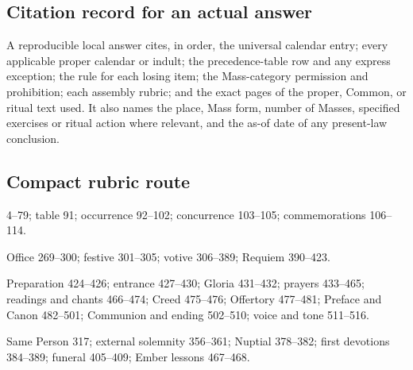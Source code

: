 \subsection{Citation record for an actual answer}

A reproducible local answer cites, in order, the universal calendar entry; every applicable proper calendar or indult; the precedence-table row and any express exception; the rule for each losing item; the Mass-category permission and prohibition; each assembly rubric; and the exact pages of the proper, Common, or ritual text used. It also names the place, Mass form, number of Masses, specified exercises or ritual action where relevant, and the as-of date of any present-law conclusion.

\subsection{Compact rubric route}

\begin{description}[style=multiline,leftmargin=0.22\linewidth,labelwidth=0.19\linewidth,itemsep=0.25em]
\item[Calendar] 4--79; table 91; occurrence 92--102; concurrence 103--105; commemorations 106--114.
\item[Mass choice] Office 269--300; festive 301--305; votive 306--389; Requiem 390--423.
\item[Assembly] Preparation 424--426; entrance 427--430; Gloria 431--432; prayers 433--465; readings and chants 466--474; Creed 475--476; Offertory 477--481; Preface and Canon 482--501; Communion and ending 502--510; voice and tone 511--516.
\item[Special tests] Same Person 317; external solemnity 356--361; Nuptial 378--382; first devotions 384--389; funeral 405--409; Ember lessons 467--468.
\end{description}
